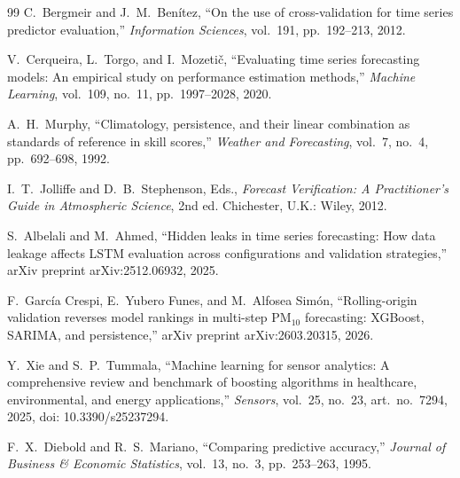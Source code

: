\documentclass[11pt,a4paper]{article}
\begin{document}
\begin{thebibliography}{99}
C.~Bergmeir and J.~M.~Ben{\'i}tez, ``On the use of cross-validation for time series predictor evaluation,'' \emph{Information Sciences}, vol.~191, pp.~192--213, 2012.

V.~Cerqueira, L.~Torgo, and I.~Mozeti{\v{c}}, ``Evaluating time series forecasting models: An empirical study on performance estimation methods,'' \emph{Machine Learning}, vol.~109, no.~11, pp.~1997--2028, 2020.

A.~H.~Murphy, ``Climatology, persistence, and their linear combination as standards of reference in skill scores,'' \emph{Weather and Forecasting}, vol.~7, no.~4, pp.~692--698, 1992.

I.~T.~Jolliffe and D.~B.~Stephenson, Eds., \emph{Forecast Verification: A Practitioner's Guide in Atmospheric Science}, 2nd ed. Chichester, U.K.: Wiley, 2012.

S.~Albelali and M.~Ahmed, ``Hidden leaks in time series forecasting: How data leakage affects LSTM evaluation across configurations and validation strategies,'' arXiv preprint arXiv:2512.06932, 2025.

F.~Garc{\'i}a Crespi, E.~Yubero Funes, and M.~Alfosea Sim{\'o}n, ``Rolling-origin validation reverses model rankings in multi-step PM$_{10}$ forecasting: XGBoost, SARIMA, and persistence,'' arXiv preprint arXiv:2603.20315, 2026.

Y.~Xie and S.~P.~Tummala, ``Machine learning for sensor analytics: A comprehensive review and benchmark of boosting algorithms in healthcare, environmental, and energy applications,'' \emph{Sensors}, vol.~25, no.~23, art.~no.~7294, 2025, doi: 10.3390/s25237294.

F.~X.~Diebold and R.~S.~Mariano, ``Comparing predictive accuracy,'' \emph{Journal of Business \& Economic Statistics}, vol.~13, no.~3, pp.~253--263, 1995.

\end{thebibliography}
\end{document}

